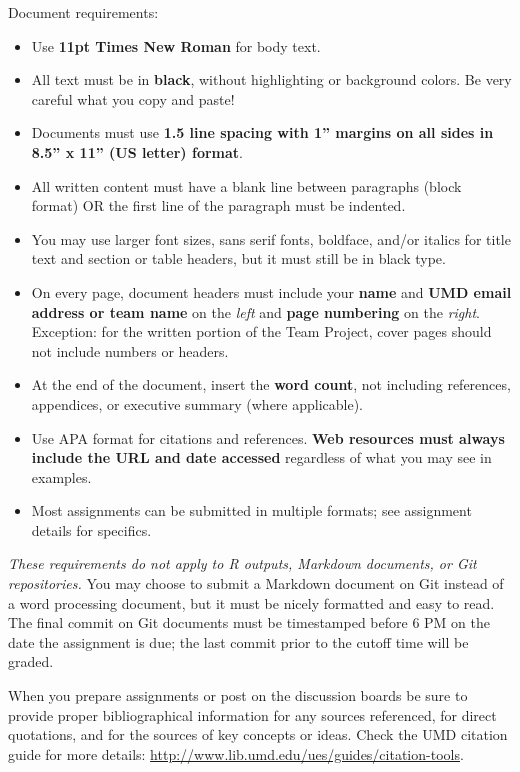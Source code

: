\documentclass[11pt]{article}
\begin{document}
Document requirements:
\begin{itemize}
	\item Use \textbf{11pt Times New Roman} for body text.
	\item All text must be in \textbf{black}, without highlighting or background colors. Be very careful what you copy and paste!
	\item Documents must use \textbf{1.5 line spacing with 1'' margins on all sides in 8.5'' x 11'' (US letter) format}.
	\item All written content must have a blank line between paragraphs (block format) OR the first line of the paragraph must be indented.
	\item You may use larger font sizes, sans serif fonts, boldface, and/or italics for title text and section or table headers, but it must still be in black type.
	\item On every page, document headers must include your \textbf{name} and \textbf{UMD email address or team name} on the \textit{left} and \textbf{page numbering} on the \textit{right}. Exception: for the written portion of the Team Project, cover pages should not include numbers or headers.
	\item At the end of the document, insert the \textbf{word count}, not including references,  appendices, or executive summary (where applicable).
	\item Use APA format for citations and references. \textbf{Web resources must always include the URL and date accessed} regardless of what you may see in examples.
	\item Most assignments can be submitted in multiple formats; see assignment details for specifics.
\end{itemize}

\textit{These requirements do not apply to R outputs, Markdown documents, or Git repositories.}
You may choose to submit a Markdown document on Git instead of a word processing document, but it must be nicely formatted and easy to read.
The final commit on Git documents must be timestamped before 6 PM on the date the assignment is due; the last commit prior to the cutoff time will be graded.

When you prepare assignments or post on the discussion boards be sure to provide proper bibliographical information for any sources referenced, for direct quotations, and for the sources of key concepts or ideas. 
Check the UMD citation guide for more details: \url{http://www.lib.umd.edu/ues/guides/citation-tools}.
\end{document}
